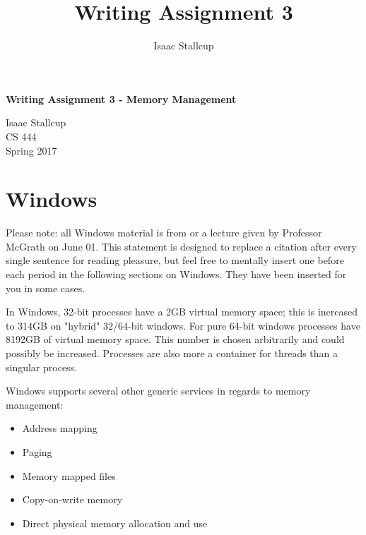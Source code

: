 \documentclass[10pt,draftclsnofoot,onecolumn,compsoc]{IEEEtran}
\author{Isaac Stallcup}
\title{Writing Assignment 3}
\begin{document}
	
	\begin{titlepage}
		
		\begin{center}

		\fontsize{20pt}{20pt}\selectfont
				
		\vspace*{3.5cm}
	
		\textbf{Writing Assignment 3 - Memory Management}\\
		
		\vspace{0.5cm}
		
		\fontsize{16pt}{16pt}\selectfont
		
		Isaac Stallcup \\
		CS 444\\
		Spring 2017\\
		

		\end{center}
	
	\end{titlepage}
	
	\section{Windows}
	
	Please note: all Windows material is from \cite{WInternals} or a lecture given by Professor McGrath on June 01. This statement is designed to replace a citation \cite{WInternals} after every single sentence for reading pleasure, but feel free to mentally insert one before each period in the following sections on Windows. They have been inserted for you in some cases.
	
	In Windows, 32-bit processes have a 2GB virtual memory space; this is increased to 314GB on "hybrid" 32/64-bit windows. For pure 64-bit windows processes have 8192GB of virtual memory space. This number is chosen arbitrarily and could possibly be increased. Processes are also more a container for threads than a singular process.
	
	Windows supports several other generic services in regards to memory management:
	\begin{itemize}
		\item Address mapping
		\item Paging
		\item Memory mapped files
		\item Copy-on-write memory
		\item Direct physical memory allocation and use
	\end{itemize}
\end{document}
